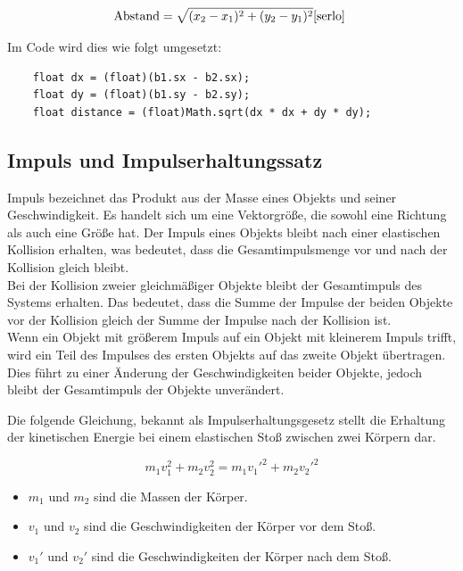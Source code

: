 \documentclass[12pt,a4paper]{article}
\begin{document}
\[
\text{Abstand} = \sqrt{(x_2 - x_1)^2 + (y_2 - y_1)^2} \cite{serlo}~
\]

Im Code wird dies wie folgt umgesetzt:

\begin{verbatim}
	float dx = (float)(b1.sx - b2.sx);
	float dy = (float)(b1.sy - b2.sy);
	float distance = (float)Math.sqrt(dx * dx + dy * dy);
\end{verbatim}





\subsection{Impuls und Impulserhaltungssatz}

Impuls bezeichnet das Produkt aus der Masse eines Objekts und seiner Geschwindigkeit. Es handelt sich um eine Vektorgröße, die sowohl eine Richtung als auch eine Größe hat. Der Impuls eines Objekts bleibt nach einer elastischen Kollision erhalten, was bedeutet, dass die Gesamtimpulsmenge vor und nach der Kollision gleich bleibt.\\
Bei der Kollision zweier gleichmäßiger Objekte bleibt der Gesamtimpuls des Systems erhalten. Das bedeutet, dass die Summe der Impulse der beiden Objekte vor der Kollision gleich der Summe der Impulse nach der Kollision ist.\\
Wenn ein Objekt mit größerem Impuls auf ein Objekt mit kleinerem Impuls trifft, wird ein Teil des Impulses des ersten Objekts auf das zweite Objekt übertragen. Dies führt zu einer Änderung der Geschwindigkeiten beider Objekte, jedoch bleibt der Gesamtimpuls der Objekte unverändert.


	\vspace{0.5cm}

Die folgende Gleichung, bekannt als Impulserhaltungsgesetz stellt die Erhaltung der kinetischen Energie bei einem elastischen Stoß zwischen zwei Körpern dar.
		
		\[
		m_1 v_1^2 +  m_2 v_2^2 =  m_1 v_1'^2 +  m_2 v_2'^2
		\]
		
		\begin{itemize}
			\item \( m_1 \) und \( m_2 \) sind die Massen der Körper.
			\item \( v_1 \) und \( v_2 \) sind die Geschwindigkeiten der Körper vor dem Stoß.
			\item \( v_1' \) und \( v_2' \) sind die Geschwindigkeiten der Körper nach dem Stoß.
		\end{itemize}
		\vspace{0.5cm}
		
\end{document}

